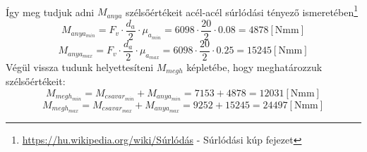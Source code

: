 \documentclass[10pt, a4paper]{article}
\newcommand{\nmm}{\mathrm{\left[Nmm\right]}}
\begin{document}
			\renewcommand{\arraystretch}{1}\\
	Így meg tudjuk adni $M_{anya}$ szélsőértékeit acél-acél súrlódási tényező ismeretében\footnote{\href{https://hu.wikipedia.org/wiki/S\%C3\%BArl\%C3\%B3d\%C3\%A1s\#A\_s\%C3\%BArl\%C3\%B3d\%C3\%A1si\_k\%C3\%Bap}{https://hu.wikipedia.org/wiki/Súrlódás} - Súrlódási kúp fejezet}
	\begin{equation}
			M_{anya_{min}} = F_v \cdot \dfrac{d_a}{2} \cdot \mu_{a_{min}} = 6098 \cdot \dfrac{20}{2} \cdot 0.08 = 4878 \nmm\tag{5.2}
	\end{equation}
	\begin{equation}
			M_{anya_{max}} = F_v \cdot \dfrac{d_a}{2} \cdot \mu_{a_{max}} = 6098 \cdot \dfrac{20}{2} \cdot 0.25 = 15245\nmm\tag{5.2}
	\end{equation}
	Végül vissza tudunk helyettesíteni $M_{megh}$ képletébe, hogy meghatározzuk szélsőértékeit:
	\begin{equation}
			M_{megh_{min}} = M_{csavar_{min}} + M_{anya_{min}} = 7153 + 4878 = 12031 \nmm\tag{5}
	\end{equation}
	\begin{equation}
			M_{megh_{max}} = M_{csavar_{max}} + M_{anya_{max}} = 9252 + 15245 = 24497 \nmm\tag{5}
	\end{equation}
	\newpage
\end{document}
